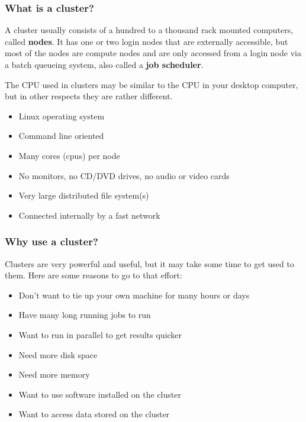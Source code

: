 \documentclass[10pt]{beamer}
\begin{document}
\begin{frame}
\frametitle{What is a cluster?}

A cluster usually consists of a hundred to a thousand rack mounted
computers, called \textbf{nodes}.  It has one or two login nodes
that are externally accessible, but most of the nodes are
compute nodes and are only accessed from a login node via a
batch queueing system, also called a \textbf{job scheduler}.

\vskip10pt
The CPU used in clusters may be similar to the CPU in your
desktop computer, but in other respects they are rather different.

\begin{itemize}
\item Linux operating system
\item Command line oriented 
\item Many cores (cpus) per node
\item No monitors, no CD/DVD drives, no audio or video cards
\item Very large distributed file system(s)
\item Connected internally by a fast network
\end{itemize}
\end{frame}

\begin{frame}
\frametitle{Why use a cluster?}
Clusters are very powerful and useful, but it may take some
time to get used to them.
Here are some reasons to go to that effort:

\begin{itemize}
\item Don't want to tie up your own machine for many hours or days
\item Have many long running jobs to run
\item Want to run in parallel to get results quicker
\item Need more disk space
\item Need more memory
\item Want to use software installed on the cluster
\item Want to access data stored on the cluster
\end{itemize}
\end{frame}
\end{document}
